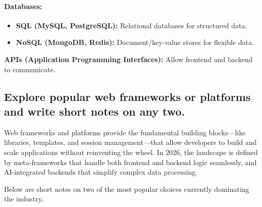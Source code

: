 \documentclass[a4paper,12pt]{article}
\begin{document}
\paragraph{Databases:}
\begin{itemize}
    \item \textbf{SQL (MySQL, PostgreSQL):} Relational databases for structured data.
    \item \textbf{NoSQL (MongoDB, Redis):} Document/key-value stores for flexible data.
\end{itemize}

\textbf{APIs (Application Programming Interfaces):} Allow frontend and backend to communicate.

\subsection{Explore popular web frameworks or platforms and write short notes on any two.}

Web frameworks and platforms provide the fundamental building blocks—like libraries, templates, and session management—that allow developers to build and scale applications without reinventing the wheel. In 2026, the landscape is defined by meta-frameworks that handle both frontend and backend logic seamlessly, and AI-integrated backends that simplify complex data processing.

Below are short notes on two of the most popular choices currently dominating the industry.
\end{document}
